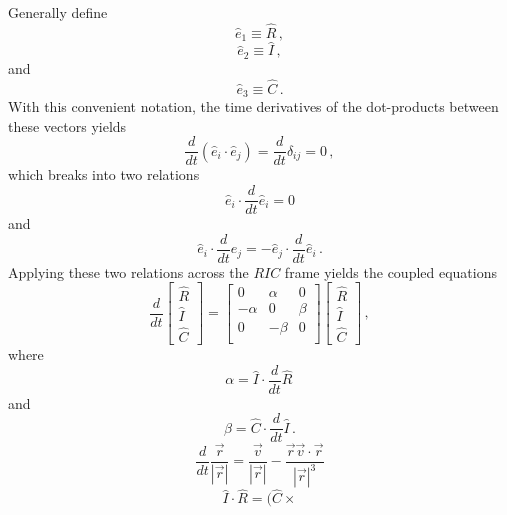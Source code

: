 \documentclass[10pt]{article}
\begin{document}
Generally define
\[
  \hat e_1 \equiv \hat R \, ,
\]
\[
  \hat e_2 \equiv \hat I \, ,
\]
and
\[
  \hat e_3 \equiv \hat C \, .
\]
With this convenient notation, the time derivatives of the dot-products between
these vectors yields
\[
  \frac{d}{dt} \left( \hat e_i \cdot \hat e_j \right) 
             = \frac{d}{dt} \delta_{ij} = 0 \, ,
\] 
which breaks into two relations
\[
  \hat e_i \cdot \frac{d}{dt} \hat e_i = 0
\]
and
\[
  \hat e_i \cdot \frac{d}{dt} \hat e_j 
       = - \hat e_j \cdot \frac{d}{dt} \hat e_i \, .
\]
Applying these two relations across the $RIC$ frame yields the coupled equations 
\[
  \frac{d}{dt} \left[ 
                       \begin{array}{c} \hat R \\ \hat I \\ \hat C \end{array} 
			   \right] = 
               \left[ \begin{array}{ccc} 0       & \alpha & 0      \\
			                             -\alpha & 0      & \beta  \\
										 0       & -\beta & 0      \\
					  \end{array}
			   \right]
			   \left[
			          \begin{array}{c} \hat R \\ \hat I \\ \hat C \end{array}
		       \right] \, ,
\]
where 
\[
  \alpha = \hat I \cdot \frac{d}{dt} \hat R \, 
\]
and
\[
  \beta = \hat C \cdot \frac{d}{dt} \hat I \, .
\]
\[
  \frac{d}{dt} \frac{\vec r}{|\vec r|} 
     = \frac{\vec v}{|\vec r|} - \frac{\vec r \vec v \cdot \vec r}{|\vec r|^3}
\]
\[
  \hat I \cdot \hat R = (\hat C \times 
\]
\end{document}

